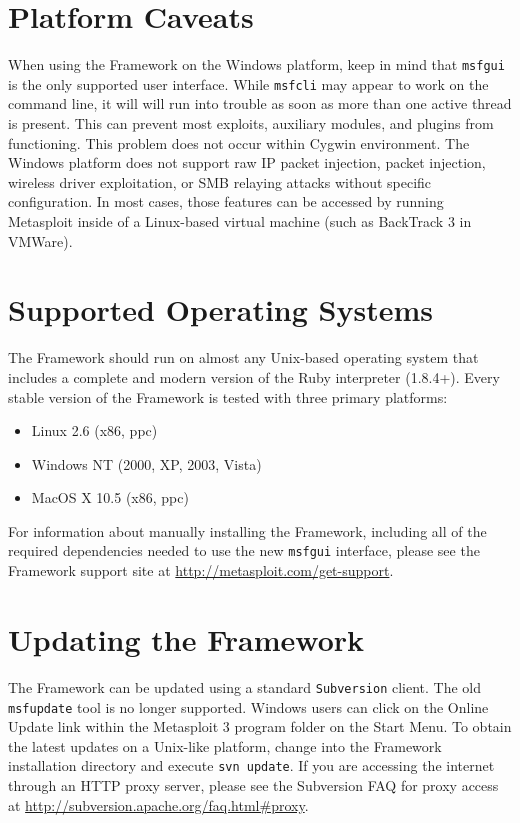 \documentclass{report}
\begin{document}
    \section{Platform Caveats}
    \label{INSTALL-CAVEAT}

\par
When using the Framework on the Windows platform, keep in mind that \texttt{msfgui} is the only
supported user interface. While \texttt{msfcli} may appear to work on the command line, it will will run into
trouble as soon as more than one active thread is present. This can prevent most exploits, auxiliary modules,
and plugins from functioning. This problem does not occur within Cygwin environment. The Windows platform does
not support raw IP packet injection, packet injection, wireless driver exploitation, or SMB relaying attacks
without specific configuration. In most cases, those features can be accessed by running Metasploit inside of a 
Linux-based virtual machine (such as BackTrack 3 in VMWare).

    \section{Supported Operating Systems}
    \label{INSTALL-SUPPORT}

\par
The Framework should run on almost any Unix-based operating system that includes a complete and modern version 
of the Ruby interpreter (1.8.4+). Every stable version of the Framework is tested with three primary platforms: 

\begin{itemize}
\item Linux 2.6 (x86, ppc)
\item Windows NT (2000, XP, 2003, Vista)
\item MacOS X 10.5 (x86, ppc)
\end{itemize}

\par
For information about manually installing the Framework, including all of the required
dependencies needed to use the new \texttt{msfgui} interface, please see the Framework
support site at \url{http://metasploit.com/get-support}.

    \section{Updating the Framework}
    \label{INSTALL-UPDATE}

\par
The Framework can be updated using a standard \texttt{Subversion} client. The
old \texttt{msfupdate} tool is no longer supported. Windows users can click on
the Online Update link within the Metasploit 3 program folder on the Start Menu.
To obtain the latest updates on a Unix-like platform, change into the Framework 
installation directory and execute \texttt{svn update}. If you are accessing the
internet through an HTTP proxy server, please see the Subversion FAQ for proxy 
access at \url{http://subversion.apache.org/faq.html#proxy}.
\end{document}
